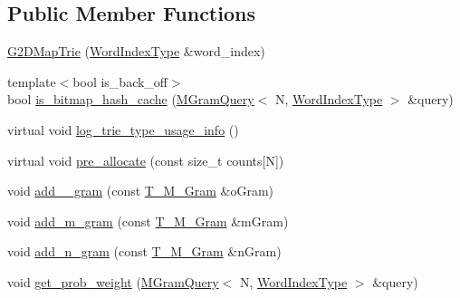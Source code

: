 \subsection*{Public Member Functions}
\begin{DoxyCompactItemize}
\item 
\hyperlink{classuva_1_1smt_1_1tries_1_1_g2_d_map_trie_a1b6cdc27651cae48f65305bbb558e8ff}{G2\+D\+Map\+Trie} (\hyperlink{classuva_1_1smt_1_1tries_1_1_word_index_trie_base_a30c4fffe3a3423c87b229b66340dd2f8}{Word\+Index\+Type} \&word\+\_\+index)
\item 
{\footnotesize template$<$bool is\+\_\+back\+\_\+off$>$ }\\bool \hyperlink{classuva_1_1smt_1_1tries_1_1_g2_d_map_trie_a663261ab0600ab3efc34955e19e9e462}{is\+\_\+bitmap\+\_\+hash\+\_\+cache} (\hyperlink{structuva_1_1smt_1_1tries_1_1_m_gram_query}{M\+Gram\+Query}$<$ N, \hyperlink{classuva_1_1smt_1_1tries_1_1_word_index_trie_base_a30c4fffe3a3423c87b229b66340dd2f8}{Word\+Index\+Type} $>$ \&query)
\item 
virtual void \hyperlink{classuva_1_1smt_1_1tries_1_1_g2_d_map_trie_ae0799cd361b6ad82a9a9ced7aac0d4f9}{log\+\_\+trie\+\_\+type\+\_\+usage\+\_\+info} ()
\item 
virtual void \hyperlink{classuva_1_1smt_1_1tries_1_1_g2_d_map_trie_af587a4b2029ede0ca42f3c29d7ca1dbe}{pre\+\_\+allocate} (const size\+\_\+t counts\mbox{[}N\mbox{]})
\item 
void \hyperlink{classuva_1_1smt_1_1tries_1_1_g2_d_map_trie_a5ef57c74c5a3c41cc082075a7f059a50}{add\+\_\+\_\+gram} (const \hyperlink{structuva_1_1smt_1_1tries_1_1mgrams_1_1_t___m___gram}{T\+\_\+\+M\+\_\+\+Gram} \&o\+Gram)
\item 
void \hyperlink{classuva_1_1smt_1_1tries_1_1_g2_d_map_trie_a4d3616f4825f3272746c80fb2d550477}{add\+\_\+m\+\_\+gram} (const \hyperlink{structuva_1_1smt_1_1tries_1_1mgrams_1_1_t___m___gram}{T\+\_\+\+M\+\_\+\+Gram} \&m\+Gram)
\item 
void \hyperlink{classuva_1_1smt_1_1tries_1_1_g2_d_map_trie_a39f6a97e094b0e149f798f35c034e25a}{add\+\_\+n\+\_\+gram} (const \hyperlink{structuva_1_1smt_1_1tries_1_1mgrams_1_1_t___m___gram}{T\+\_\+\+M\+\_\+\+Gram} \&n\+Gram)
\item 
void \hyperlink{classuva_1_1smt_1_1tries_1_1_g2_d_map_trie_a14d724b28fd0b1a5da3661ec01dc7df6}{get\+\_\+prob\+\_\+weight} (\hyperlink{structuva_1_1smt_1_1tries_1_1_m_gram_query}{M\+Gram\+Query}$<$ N, \hyperlink{classuva_1_1smt_1_1tries_1_1_word_index_trie_base_a30c4fffe3a3423c87b229b66340dd2f8}{Word\+Index\+Type} $>$ \&query)

\end{DoxyCompactItemize}

